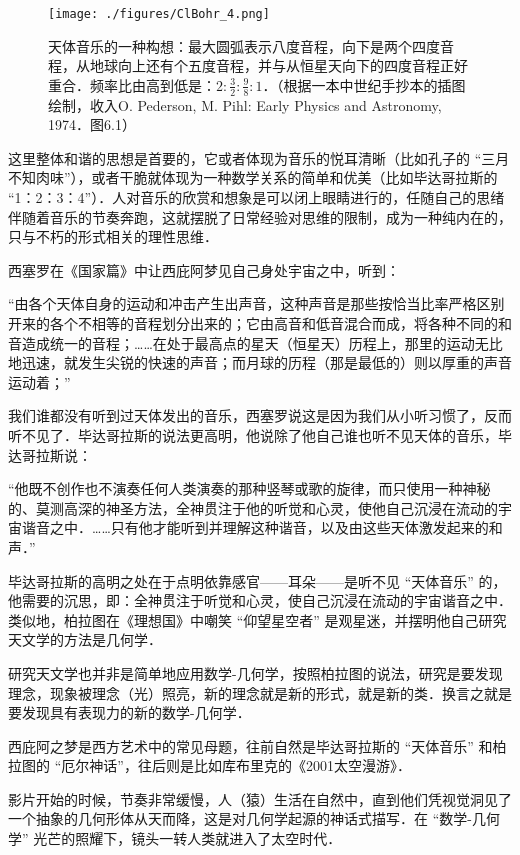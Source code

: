 \begin{figure}[ht]
\centering
\texttt{[image: ./figures/ClBohr\_4.png]}
\caption{天体音乐的一种构想：最大圆弧表示八度音程，向下是两个四度音程，从地球向上还有个五度音程，并与从恒星天向下的四度音程正好重合．频率比由高到低是：$2: \frac{3}{2} : \frac{9}{8} : 1$．（根据一本中世纪手抄本的插图绘制，收入O. Pederson, M. Pihl: Early Physics and Astronomy, 1974．图6.1）} \label{ClBohr_fig4}
\end{figure}

这里整体和谐的思想是首要的，它或者体现为音乐的悦耳清晰（比如孔子的 “三月不知肉味”），或者干脆就体现为一种数学关系的简单和优美（比如毕达哥拉斯的 “1：2：3：4”）．人对音乐的欣赏和想象是可以闭上眼睛进行的，任随自己的思绪伴随着音乐的节奏奔跑，这就摆脱了日常经验对思维的限制，成为一种纯内在的，只与不朽的形式相关的理性思维．

西塞罗在《国家篇》中让西庇阿梦见自己身处宇宙之中，听到：

“由各个天体自身的运动和冲击产生出声音，这种声音是那些按恰当比率严格区别开来的各个不相等的音程划分出来的；它由高音和低音混合而成，将各种不同的和音造成统一的音程；……在处于最高点的星天（恒星天）历程上，那里的运动无比地迅速，就发生尖锐的快速的声音；而月球的历程（那是最低的）则以厚重的声音运动着；”

我们谁都没有听到过天体发出的音乐，西塞罗说这是因为我们从小听习惯了，反而听不见了．毕达哥拉斯的说法更高明，他说除了他自己谁也听不见天体的音乐，毕达哥拉斯说：

“他既不创作也不演奏任何人类演奏的那种竖琴或歌的旋律，而只使用一种神秘的、莫测高深的神圣方法，全神贯注于他的听觉和心灵，使他自己沉浸在流动的宇宙谐音之中．……只有他才能听到并理解这种谐音，以及由这些天体激发起来的和声．”

毕达哥拉斯的高明之处在于点明依靠感官——耳朵——是听不见 “天体音乐” 的，他需要的沉思，即：全神贯注于听觉和心灵，使自己沉浸在流动的宇宙谐音之中．类似地，柏拉图在《理想国》中嘲笑 “仰望星空者” 是观星迷，并摆明他自己研究天文学的方法是几何学．

研究天文学也并非是简单地应用数学-几何学，按照柏拉图的说法，研究是要发现理念，现象被理念（光）照亮，新的理念就是新的形式，就是新的类．换言之就是要发现具有表现力的新的数学-几何学．

西庇阿之梦是西方艺术中的常见母题，往前自然是毕达哥拉斯的 “天体音乐” 和柏拉图的 “厄尔神话”，往后则是比如库布里克的《2001太空漫游》．

影片开始的时候，节奏非常缓慢，人（猿）生活在自然中，直到他们凭视觉洞见了一个抽象的几何形体从天而降，这是对几何学起源的神话式描写．在 “数学-几何学” 光芒的照耀下，镜头一转人类就进入了太空时代．

